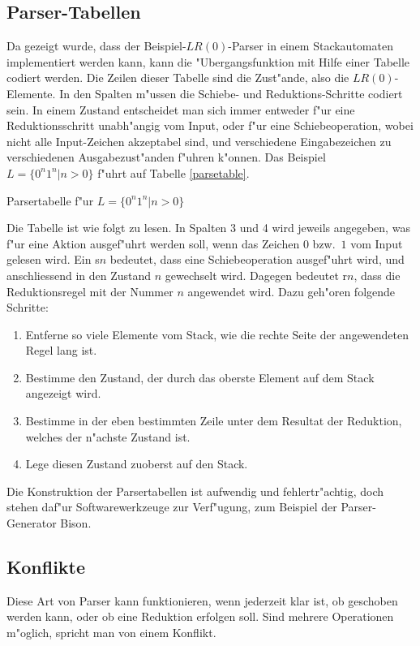 \subsection{Parser-Tabellen}
Da gezeigt wurde, dass der Beispiel-$LR(0)$-Parser in einem Stackautomaten
implementiert werden kann, kann die "Ubergangsfunktion mit Hilfe
einer Tabelle codiert werden. Die Zeilen dieser Tabelle sind die
Zust"ande, also die $LR(0)$-Elemente. In den Spalten m"ussen die
Schiebe- und Reduktions-Schritte codiert sein. In einem Zustand
entscheidet man sich immer entweder f"ur eine Reduktionsschritt
unabh"angig vom Input, oder f"ur eine Schiebeoperation, wobei
nicht alle Input-Zeichen akzeptabel sind, und verschiedene Eingabezeichen
zu verschiedenen Ausgabezust"anden f"uhren k"onnen. Das Beispiel
$L=\{0^n1^n|n>0\}$ f"uhrt auf Tabelle \ref{parsetable}.
\begin{table}

\caption{Parsertabelle f"ur $L=\{0^n1^n|n>0\}$\label{parsetable}}
\end{table}
Die Tabelle ist wie folgt zu lesen. In Spalten 3 und 4 wird jeweils
angegeben, was f"ur eine Aktion ausgef"uhrt werden soll, wenn das
Zeichen $0$ bzw.~$1$ vom Input gelesen wird. Ein s$n$ bedeutet, dass
eine Schiebeoperation ausgef"uhrt wird, und anschliessend in den
Zustand $n$ gewechselt wird. Dagegen bedeutet r$n$,
dass die Reduktionsregel mit der Nummer $n$ angewendet wird.
Dazu geh"oren folgende Schritte:
\begin{enumerate}
\item
Entferne so viele Elemente vom Stack, wie die rechte Seite der angewendeten
Regel lang ist.
\item
Bestimme den Zustand, der durch das oberste Element auf dem Stack
angezeigt wird.
\item
Bestimme in der eben bestimmten Zeile unter dem Resultat der Reduktion,
welches der n"achste Zustand ist.
\item
Lege diesen Zustand zuoberst auf den Stack.
\end{enumerate}
Die Konstruktion der Parsertabellen ist aufwendig und fehlertr"achtig,
doch stehen daf"ur Softwarewerkzeuge zur Verf"ugung, zum Beispiel
der Parser-Generator Bison.

\subsection{Konflikte}
Diese Art von Parser kann funktionieren, wenn jederzeit klar ist, ob
geschoben werden kann, oder ob eine Reduktion erfolgen soll.
Sind mehrere Operationen m"oglich, spricht man von einem Konflikt.
